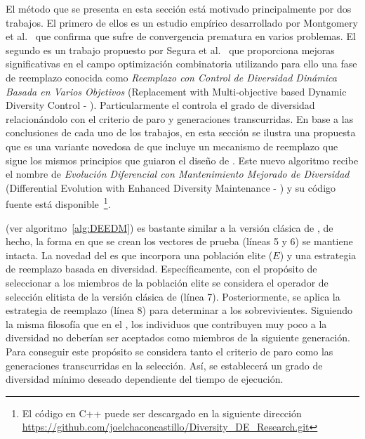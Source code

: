 El método que se presenta en esta sección está motivado principalmente por dos trabajos.
%
El primero de ellos es un estudio empírico desarrollado por Montgomery et al.~\cite{montgomery2012simple} que confirma que 
\DE{} sufre de convergencia prematura en varios problemas.
%
El segundo es un trabajo propuesto por Segura et al.~\cite{segura2016novel} que proporciona mejoras significativas en el campo optimización combinatoria
utilizando para ello una fase de reemplazo conocida como \textit{Reemplazo con Control de Diversidad Dinámica Basada en Varios Objetivos} 
(Replacement with Multi-objective based Dynamic Diversity Control - \RMDDC{}).
%
Particularmente el \RMDDC{} controla el grado de diversidad relacionándolo con el criterio de paro y generaciones transcurridas.
%
En base a las conclusiones de cada uno de los trabajos, en esta sección se ilustra una propuesta que es una variante novedosa de \DE{} que
incluye un mecanismo de reemplazo que sigue los mismos principios que guiaron el diseño de \RMDDC{}.
%
Este nuevo algoritmo recibe el nombre de \textit{Evolución Diferencial con Mantenimiento Mejorado de Diversidad} 
(Differential Evolution with Enhanced Diversity Maintenance - \DEEDM{}) y su código fuente está disponible~\footnote{El código en C++ puede ser descargado en la siguiente dirección \url{https://github.com/joelchaconcastillo/Diversity\_DE\_Research.git}}.

\DEEDM{} (ver algoritmo~\ref{alg:DEEDM}) es bastante similar a la versión clásica de \DE{}, de hecho, 
la forma en que se crean los vectores de prueba (líneas 5 y 6) se mantiene intacta.
%
La novedad del \DEEDM{} es que incorpora una población elite ($E$) y una estrategia de reemplazo basada en diversidad.
%
Específicamente, con el propósito de seleccionar a los miembros de la población elite se considera el operador de selección elitista de la versión clásica
de \DE{} (línea 7).
%
Posteriormente, se aplica la estrategia de reemplazo (línea 8) para determinar a los sobrevivientes.
%
Siguiendo la misma filosofía que en el \RMDDC{}, los individuos que contribuyen muy poco a la diversidad no deberían ser aceptados como miembros 
de la siguiente generación.
%
Para conseguir este propósito se considera tanto el criterio de paro como las generaciones transcurridas en la selección.
%
Así, se establecerá un grado de diversidad mínimo deseado dependiente del tiempo de ejecución.

